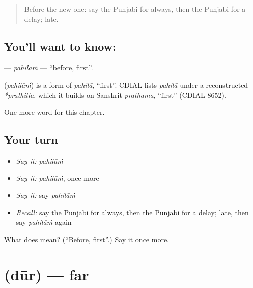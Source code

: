 \label{lesson:PA-C87-pahilam}



\begin{quote}
Before the new one: say the Punjabi for always, then the Punjabi for a delay; late.
\end{quote}

\subsection*{You'll want to know: }
\textbf{} — \emph{pahilāṁ} — \textquotedblleft{}before, first\textquotedblright{}.

\begin{cousinweb}
\textbf{} (\emph{pahilāṁ}) is a form of \emph{pahilā}, \textquotedblleft{}first\textquotedblright{}. CDIAL lists \emph{pahilā} under a reconstructed \emph{*prathilla}, which it builds on Sanskrit \emph{prathama}, \textquotedblleft{}first\textquotedblright{} (CDIAL 8652).
\end{cousinweb}

\begin{grammarlens}[title={What you've built}]
One more word for this chapter.
\end{grammarlens}

\subsection*{Your turn}
\begin{itemize}
\raggedright
  \item \emph{Say it:} \emph{pahilāṁ}
  \item \emph{Say it:} \emph{pahilāṁ}, once more
  \item \emph{Say it:} say \emph{pahilāṁ}
  \item \emph{Recall:} say the Punjabi for always, then the Punjabi for a delay; late, then say \emph{pahilāṁ} again
\end{itemize}

\begin{tcolorbox}[breakable,colback=teal!4,colframe=teal!35!black,title={Before you move on}]
What does  mean? (\textquotedblleft{}Before, first\textquotedblright{}.) Say it once more.
\end{tcolorbox}
\section[\texorpdfstring{\pa{ਦੂਰ} (dūr)}{ਦੂਰ (dūr)}]{ (dūr) — far}

